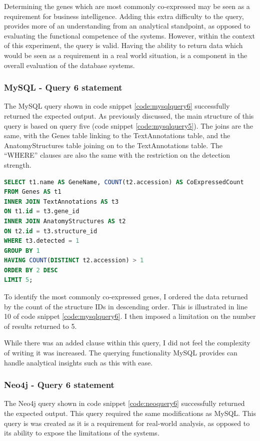 Determining the genes which are most commonly co-expressed may be seen as a requirement for business intelligence. Adding this extra difficulty to the query, provides more of an understanding from an analytical standpoint, as opposed to evaluating the functional competence of the systems. However, within the context of this experiment, the query is valid. Having the ability to return data which would be seen as a requirement in a real world situation, is a component in the overall evaluation of the database systems.

\subsubsection*{MySQL - Query 6 statement}\label{mysqlquery6statement}
The MySQL query shown in code snippet \ref{code:mysqlquery6} successfully returned the expected output. As previously discussed, the main structure of this query is based on query five (code snippet \ref{code:mysqlquery5}). The joins are the same, with the Genes table linking to the TextAnnotations table, and the AnatomyStructures table joining on to the TextAnnotations table. The ``WHERE'' clauses are also the same with the restriction on the detection strength.

\begin{lstlisting}[language=SQL, caption=MySQL query 6 statement. Which Genes are most commonly co-expressed?., label=code:mysqlquery6]
SELECT t1.name AS GeneName, COUNT(t2.accession) AS CoExpressedCount
FROM Genes AS t1
INNER JOIN TextAnnotations AS t3
ON t1.id = t3.gene_id
INNER JOIN AnatomyStructures AS t2
ON t2.id = t3.structure_id
WHERE t3.detected = 1
GROUP BY 1
HAVING COUNT(DISTINCT t2.accession) > 1
ORDER BY 2 DESC
LIMIT 5;
\end{lstlisting}

To identify the most commonly co-expressed genes, I ordered the data returned by the count of the structure IDs in descending order. This is illustrated in line 10 of code snippet \ref{code:mysqlquery6}. I then imposed a limitation on the number of results returned to 5.

While there was an added clause within this query, I did not feel the complexity of writing it was increased. The querying functionality MySQL provides can handle analytical insights such as this with ease.
\newpage
\subsubsection*{Neo4j - Query 6 statement}\label{neoquery6statement}
The Neo4j query shown in code snippet \ref{code:neoquery6} successfully returned the expected output. This query required the same modifications as MySQL. This query is was created as it is a requirement for real-world analysis, as opposed to its ability to expose the limitations of the systems.

